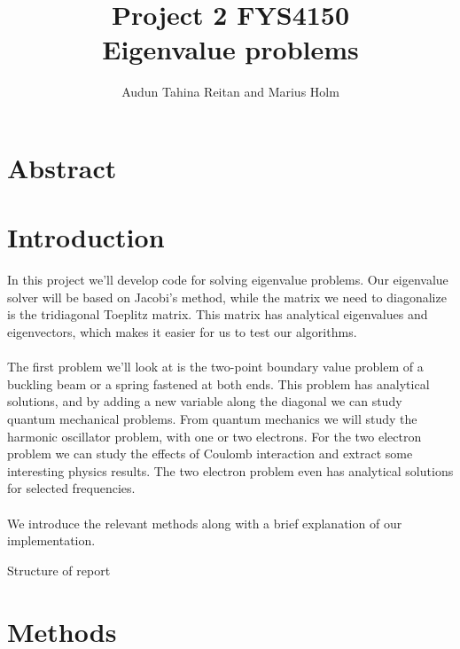 \documentclass[a4paper, fontsize=11pt]{article}
\begin{document}
\title{Project 2 FYS4150 \\ Eigenvalue problems}
\author{Audun Tahina Reitan and Marius Holm}

\maketitle


\section{Abstract}



\section{Introduction}
In this project we'll develop code for solving eigenvalue problems. Our eigenvalue solver will be based on Jacobi's method, while the matrix we need to diagonalize is the tridiagonal Toeplitz matrix. This matrix has analytical eigenvalues and eigenvectors, which makes it easier for us to test our algorithms. 


\paragraph{}
The first problem we'll look at is the two-point boundary value problem of a buckling beam or a spring fastened at both ends. This problem has analytical solutions, and by adding a new variable along the diagonal we can study quantum mechanical problems. From quantum mechanics we will study the harmonic oscillator problem, with one or two electrons. For the two electron problem we can study the effects of Coulomb interaction and extract some interesting physics results.  The two electron problem even has analytical solutions for selected frequencies.\cite{PhysRevA.48.3561}

\paragraph{}
We introduce the relevant methods along with a brief explanation of our implementation.


Structure of report


\section{Methods}
\end{document}
